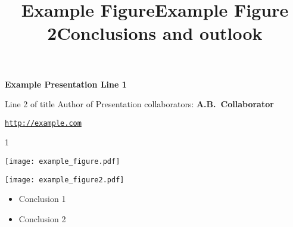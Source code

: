 \documentclass{ian-presentation}
\begin{document}
\pagestyle{empty}
\hbox{}\vfil
\bf\Large
\hfil Example Presentation Line 1\par
\hfil Line 2 of title
\vfil
\large
\hfil Author of Presentation
\normalsize
\vfil
\rm
\hfil collaborators: {\bf A.B.\-~Collaborator}\par
\vfil
\hfill{\tt \href{http://example.com}{http://example.com}}
\eject

\setcounter{page}1
\pagestyle{plain}

\title{Example Figure}

\hfil\texttt{[image: example\_figure.pdf]}
\vfill
\eject

\title{Example Figure 2}
\hfil\texttt{[image: example\_figure2.pdf]}
\vfill
\eject

\title{Conclusions and outlook}
\begin{itemize}
  \item Conclusion 1
  \item Conclusion 2
\end{itemize}
\vfill
\end{document}
